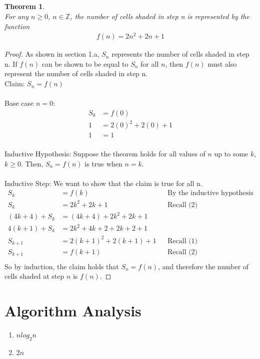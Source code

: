 \documentclass{article}
\newtheorem*{thm} {Theorem}
\begin{document}
\subsection{}
	\begin{thm}\ \\
		For any $n \geq 0$, $n \in \mathbb{Z}$, the number of cells shaded in step n is represented by the function
		\begin{align}
			f(n) = 2n^2+2n+1
		\end{align}
	\end{thm}
	\begin{proof}
		As shown in section 1.a, $S_n$ %
		represents the number of cells shaded in step n. If $f(n)$ can be shown to be equal to $S_n$ for all $n$,
		then $f(n)$ must also represent the number of cells shaded in step n.\\
		\newline
		Claim: $S_n = f(n)$\\\\
		Base case $n=0$:
		\begin{align*}
			S_0 &= f(0)\\
			1 &= 2(0)^2+2(0)+1\\
			1 &= 1
		\end{align*}\\
		Inductive Hypothesis: Suppose the theorem holds for all values of $n$ up to some $k$, $k \geq 0$. Then, $S_n = f(n)$ is true when $n = k$.\\\\
		Inductive Step: We want to show that the claim is true for all n.\\
		\begin{align*}
			S_k &= f(k) && \text{By the inductive hypothesis}\\
			S_k &= 2k^2+2k+1 && \text{Recall (2)}\\
			(4k+4)+S_k &= (4k+4)+2k^2+2k+1\\
			4(k+1)+S_k &= 2k^2+4k+2+2k+2+1\\
			S_{k+1} &= 2(k+1)^2+2(k+1)+1 && \text{Recall (1)}\\
			S_{k+1} &= f(k+1) && \text{Recall (2)}\\
		\end{align*}
		So by induction, the claim holds that $S_n = f(n)$, and therefore the number of cells shaded at step $n$ is $f(n)$.
	\end{proof}
\section{Algorithm Analysis}
	\begin{enumerate}[label=(\alph*)]
		\item $nlog_2{n}$
		\item $2n$
	\end{enumerate}
\end{document}
